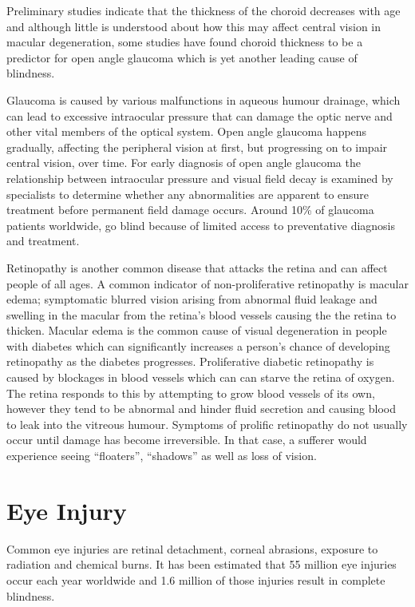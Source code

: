 Preliminary studies indicate that the thickness of the choroid decreases
with age and although little is understood about how this may affect
central vision in macular degeneration, some studies have found
choroid thickness to be a predictor for open angle glaucoma which
is yet another leading cause of blindness.\cite{margolis2009pilot,gordon2002ocular}

Glaucoma is caused by various malfunctions in aqueous humour
drainage, which can lead to excessive intraocular pressure that can
damage the optic nerve and other vital members of the optical system.
\cite{distelhorst2003open}
Open angle glaucoma happens gradually, affecting the peripheral vision
at first, but progressing on to impair central vision, over time. For early
diagnosis of open angle glaucoma the relationship between intraocular
pressure and visual field decay is examined by specialists to determine
whether any abnormalities are apparent to ensure treatment before
permanent field damage occurs.\cite{goldmann1972open} Around
10\% of glaucoma patients worldwide, go blind because of limited
access to preventative diagnosis and treatment.\cite{west2000looking}

Retinopathy is another common disease that attacks the retina and 
can affect people of all ages. A common indicator of non-proliferative
retinopathy is macular edema; symptomatic blurred vision arising from
abnormal fluid leakage and swelling in the macular from the retina's
blood vessels causing the the retina to thicken.\cite{hee1995quantitative}
Macular edema is the common cause of visual degeneration in people
with diabetes which can significantly increases a person's chance of
developing retinopathy as the diabetes progresses.\cite{klein1984wisconsin}
Proliferative diabetic retinopathy is caused by blockages in blood vessels
which can can starve the retina of oxygen. The retina responds to this by
attempting to grow blood vessels of its own, however they tend to be
abnormal and hinder fluid secretion and causing blood to leak into the 
vitreous humour. Symptoms of prolific retinopathy do not usually occur 
until damage has become irreversible. In that case, a sufferer would
experience seeing \enquote{floaters}, \enquote{shadows} as well as
loss of vision.

\section{Eye Injury}

Common eye injuries are retinal detachment, corneal abrasions, exposure to
radiation and chemical burns. It has been estimated that 55 million eye injuries
occur each year worldwide and 1.6 million of those injuries result in complete
blindness.\cite{negrel1998global}

